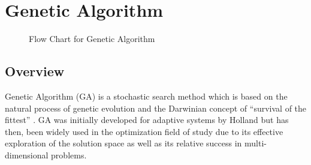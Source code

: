 \section{Genetic Algorithm}
\begin{figure}[htbp!]
	\begin{center}
	\caption{Flow Chart for Genetic Algorithm}
	\label{fig:GeneticAlgorithmFlowChart}
	\end{center}
\end{figure}
\subsection{Overview}
Genetic Algorithm (GA) is a stochastic search method which is based on the natural process of genetic evolution and the Darwinian concept of ``survival of the fittest'' \cite{DistributedHierarchicalGA,AcceleratingGA,AdaptiveSAGA,FamilyGA}. GA was initially developed for adaptive systems by Holland but has then, been widely used in the optimization field of study due to its effective exploration of the solution space as well as its relative success in multi-dimensional problems\cite{ParallelGASA,DistributedHierarchicalGA,FamilyGA}. 

